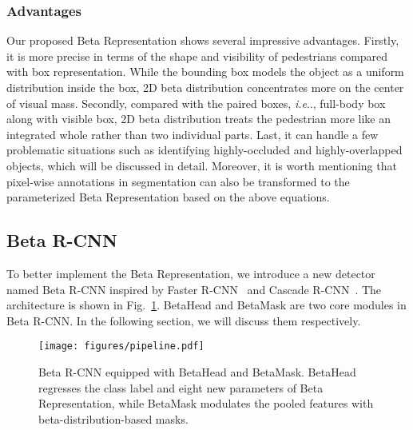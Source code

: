 \documentclass{article}
\makeatletter
\DeclareRobustCommand\onedot{\futurelet\@let@token\@onedot}
\def\@onedot{\ifx\@let@token.\else.\null\fi\xspace}
\def\ie{\emph{i.e}\onedot} \def\Ie{\emph{I.e}\onedot}
\makeatother
\begin{document}
\subsubsection{Advantages}
Our proposed Beta Representation shows several impressive advantages. 
Firstly, it is more precise in terms of the shape and visibility of pedestrians compared with box representation.
While the bounding box models the object as a uniform distribution inside the box, 2D beta distribution concentrates more on the center of visual mass.
Secondly, compared with the paired boxes, \ie, full-body box along with visible box, 2D beta distribution treats the pedestrian more like an integrated whole rather than two individual parts.
Last, it can handle a few problematic situations such as identifying highly-occluded and highly-overlapped objects, which will be discussed in detail. 
Moreover, it is worth mentioning that pixel-wise annotations in segmentation can also be transformed to the parameterized Beta Representation based on the above equations.









\subsection{Beta R-CNN}
To better implement the Beta Representation, we introduce a new detector named Beta R-CNN inspired by Faster R-CNN~\cite{faster} and Cascade R-CNN~\cite{cascadercnn}. The architecture is shown in Fig.~\ref{BetaRCNN}. BetaHead and BetaMask are two core modules in Beta R-CNN.  In the following section, we will discuss them respectively.
\begin{figure}
    \centering
    \texttt{[image: figures/pipeline.pdf]}
    \caption{Beta R-CNN equipped with BetaHead and BetaMask. BetaHead regresses the class label and eight new parameters of Beta Representation, while BetaMask modulates the pooled features with beta-distribution-based masks.}
    \label{BetaRCNN}
\end{figure}
\end{document}
